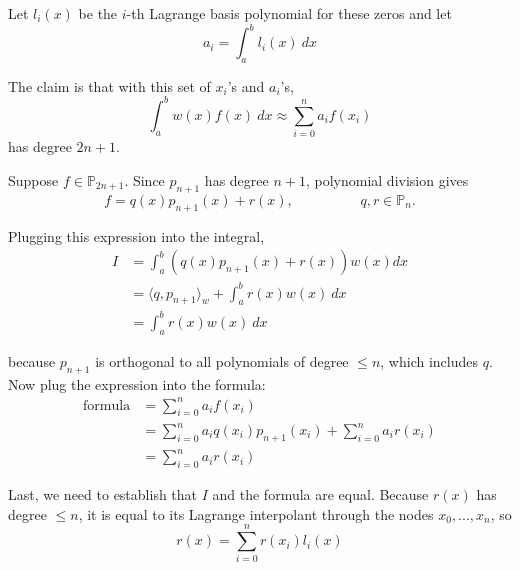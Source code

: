 \documentclass[a4paper,11pt]{report}
\begin{document}
\begin{enumerate}
\begin{itemize}
    Let $l_{i} (x)$ be the $i$-th Lagrange basis polynomial for these zeros and let
    \begin{equation*}
    a_{i} = \int_{a}^{b} l_{i} (x)\ dx
    \end{equation*}    

    The claim is that with this set of $x_{i}$'s and $a_{i}$'s, 
    \begin{equation*}
    \int_{a}^{b} w(x) f(x)\ dx \approx \sum_{i=0}^{n} a_{i} f(x_{i})
    \end{equation*}
     has degree $2n+1$. 

    Suppose $f \in \mathbb{P}_{2n+1}$. Since $p_{n+1}$ has degree $n+1$, polynomial division gives
    \begin{equation*}
    f = q(x)p_{n+1} (x) + r(x), \hspace{2cm} q, r \in \mathbb{P}_{n}.
    \end{equation*}

    Plugging this expression into the integral,
    \begin{equation*}
    \begin{aligned}
    I &= \int_{a}^{b} (q(x)p_{n+1}(x) + r(x)) w(x) dx \\
      &= \langle q, p_{n+1} \rangle_{w} + \int_{a}^{b} r(x) w(x)\ dx \\
      &= \int_{a}^{b} r(x) w(x)\ dx
    \end{aligned}
    \end{equation*}

    because $p_{n+1}$ is orthogonal to all polynomials of degree $\le n$, which includes $q$. Now plug the expression into the formula:
    \begin{equation*}
    \begin{aligned}
    \text{formula} &= \sum_{i=0}^{n} a_{i} f(x_{i}) \\
    &= \sum_{i=0}^{n} a_{i} q(x_{i}) p_{n+1}(x_{i}) + \sum_{i=0}^{n} a_{i} r(x_{i}) \\
    &= \sum_{i=0}^{n} a_{i} r(x_{i})
    \end{aligned}
    \end{equation*}
 
    Last, we need to establish that $I$ and the formula are equal. Because $r(x)$ has degree $\le n$, it is equal to its Lagrange interpolant through the nodes $x_{0},...,x_{n}$, so
    \begin{equation*}
    r(x) = \sum_{i=0}^{n} r(x_{i}) l_{i}(x)
    \end{equation*}


\end{itemize}
\end{enumerate}
\end{document}
